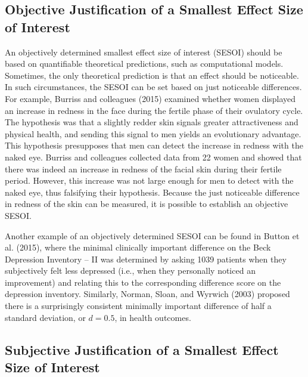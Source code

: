 \documentclass[english,floatsintext,man]{apa6}
\theoremstyle{definition}
\theoremstyle{definition}
\theoremstyle{definition}
\theoremstyle{remark}
\begin{document}
\subsection{Objective Justification of a Smallest Effect Size of
Interest}\label{objective-justification-of-a-smallest-effect-size-of-interest}

An objectively determined smallest effect size of interest (SESOI)
should be based on quantifiable theoretical predictions, such as
computational models. Sometimes, the only theoretical prediction is that
an effect should be noticeable. In such circumstances, the SESOI can be
set based on just noticeable differences. For example, Burriss and
colleagues (2015) examined whether women displayed an increase in
redness in the face during the fertile phase of their ovulatory cycle.
The hypothesis was that a slightly redder skin signals greater
attractiveness and physical health, and sending this signal to men
yields an evolutionary advantage. This hypothesis presupposes that men
can detect the increase in redness with the naked eye. Burriss and
colleagues collected data from 22 women and showed that there was indeed
an increase in redness of the facial skin during their fertile period.
However, this increase was not large enough for men to detect with the
naked eye, thus falsifying their hypothesis. Because the just noticeable
difference in redness of the skin can be measured, it is possible to
establish an objective SESOI.

Another example of an objectively determined SESOI can be found in
Button et al. (2015), where the minimal clinically important difference
on the Beck Depression Inventory -- II was determined by asking 1039
patients when they subjectively felt less depressed (i.e., when they
personally noticed an improvement) and relating this to the
corresponding difference score on the depression inventory. Similarly,
Norman, Sloan, and Wyrwich (2003) proposed there is a surprisingly
consistent minimally important difference of half a standard deviation,
or \(d = 0.5\), in health outcomes.

\subsection{Subjective Justification of a Smallest Effect Size of
Interest}\label{subjective-justification-of-a-smallest-effect-size-of-interest}
\end{document}
